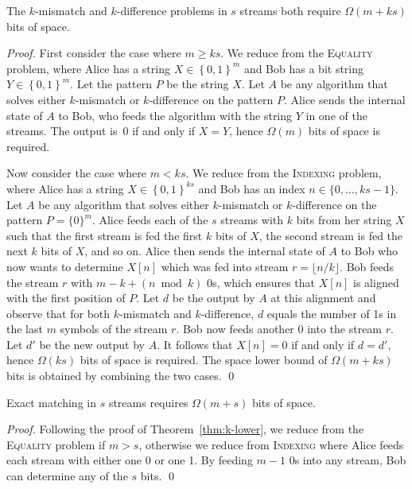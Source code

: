 \documentclass[envcountsame]{llncs}
\renewcommand{\geq}{\geqslant}
\newcommand{\indexing}{\textsc{Indexing}\xspace}
\newcommand{\equality}{\textsc{Equality}\xspace}
\begin{document}
\begin{theorem}
    \label{thm:k-lower}
    The $k$-mismatch and $k$-difference problems in $s$ streams both require $\Omega(m+ks)$ bits of space.
\end{theorem}
\begin{proof}
    First consider the case where $m\geq ks$. We reduce from the \equality problem, where Alice has a string $X\in\left\{ 0,1\right\}^{m}$ and Bob has a bit string $Y\in\left\{ 0,1\right\} ^{m}$.
    Let the pattern $P$ be the string $X$. Let $A$ be any algorithm that solves either $k$-mismatch or $k$-difference on the pattern $P$. Alice sends the internal state of $A$ to Bob, who feeds the algorithm with the string $Y$ in one of the streams. The output is~0 if and only if $X=Y$, hence $\Omega(m)$ bits of space is required.

    Now consider the case where $m<ks$. We reduce from the \indexing problem, where Alice has a string $X\in\left\{ 0,1\right\}^{ks}$ and Bob has an index $n\in\{0,\ldots, ks-1\}$. Let $A$ be any algorithm that solves either $k$-mismatch or $k$-difference on the pattern $P=\{0\}^m$. Alice feeds each of the $s$ streams with $k$ bits from her string $X$ such that the first stream is fed the first $k$ bits of $X$, the second stream is fed the next $k$ bits of $X$, and so on. Alice then sends the internal state of $A$ to Bob who now wants to determine $X[n]$ which was fed into stream $r=\lfloor n/k\rfloor$. Bob feeds the stream $r$ with $m-k+(n\bmod k)$ 0s, which ensures that $X[n]$ is aligned with the first position of $P$. Let $d$ be the output by $A$ at this alignment and observe that for both $k$-mismatch and $k$-difference, $d$ equals the number of 1s in the last $m$ symbols of the stream $r$. Bob now feeds another 0 into the stream $r$. Let $d'$ be the new output by $A$. It follows that $X[n]=0$ if and only if $d=d'$, hence $\Omega(ks)$ bits of space is required.    The space lower bound of $\Omega(m+ks)$ bits is obtained by combining the two cases.
    \qed
\end{proof}

\begin{theorem}
    Exact matching in $s$ streams requires $\Omega(m+s)$ bits of space.
\end{theorem}
\begin{proof}
    Following the proof of Theorem~\ref{thm:k-lower}, we reduce from the \equality problem if $m>s$, otherwise we reduce from \indexing where Alice feeds each stream with either one 0 or one 1. By feeding $m-1$ 0s into any stream, Bob can determine any of the $s$ bits.
    \qed
\end{proof}
\end{document}
